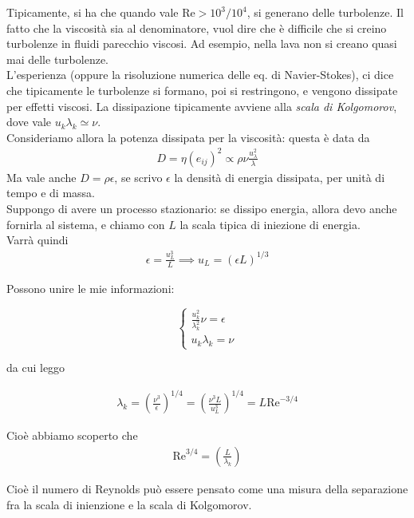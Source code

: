\documentclass{report}
\begin{document}
Tipicamente, si ha che quando vale \(\text{Re} > 10^3/10^4\), si generano delle turbolenze. Il fatto che la viscosità sia al denominatore, vuol dire che è difficile che si creino turbolenze in fluidi parecchio viscosi. Ad esempio, nella lava non si creano quasi mai delle turbolenze. \\

L'esperienza (oppure la risoluzione numerica delle eq. di Navier-Stokes), ci dice che tipicamente le turbolenze si formano, poi si restringono, e vengono dissipate per effetti viscosi. 
La dissipazione tipicamente avviene alla \emph{scala di Kolgomorov}, dove vale \(u_{k}\lambda_k \simeq \nu\). \\

Consideriamo allora la potenza dissipata per la viscosità: questa è data da 
\begin{align}
    D = \eta (e_{ij})^2 \propto \rho \nu \frac{u_{\lambda}^2}{\lambda}
\end{align}
Ma vale anche \(D = \rho\epsilon\), se scrivo \(\epsilon\) la densità di energia dissipata, per unità di tempo e di massa. \\

Suppongo di avere un processo stazionario: se dissipo energia, allora devo anche fornirla al sistema, e chiamo con \(L\) la scala tipica di iniezione di energia. \\
Varrà quindi 
\begin{align}
    \epsilon = \frac{u_L^3}{L} \implies u_L = (\epsilon L)^{1/3}
\end{align}


Possono unire le mie informazioni: 


\[\begin{cases}
    \frac{u_k^2}{\lambda_k^2}\nu = \epsilon \\ u_k\lambda_k = \nu
\end{cases}\]


da cui leggo 

\begin{align}
\lambda_k = \left(\frac{\nu^3}{\epsilon} \right)^{1/4} =  \left(\frac{\nu^3L}{u^3_L} \right)^{1/4} = L \text{Re}^{-3/4}
\end{align}

Cioè abbiamo scoperto che 
\begin{align}
    \text{Re}^{3/4} = \left(\frac{L}{\lambda_k} \right)
\end{align}

Cioè il numero di Reynolds può essere pensato come una misura della separazione fra la scala di inienzione e la scala di Kolgomorov. \\
\end{document}
